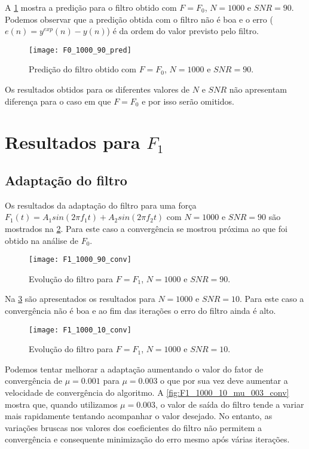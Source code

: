 A \cref{fig:F0_1000_90_pred} mostra a predição para o filtro obtido com $ F=F_0 $, $ N=1000 $ e $ SNR=90 $. Podemos observar que a predição obtida com o filtro não é boa e o erro ($ e(n)=y^{exp}(n) - y(n) $) é da ordem do valor previsto pelo filtro.

\begin{figure}[h]
	\centering
	\texttt{[image: F0\_1000\_90\_pred]}
	\caption{Predição do filtro obtido com $ F=F_0 $, $ N=1000 $ e $ SNR=90 $.}
	\label{fig:F0_1000_90_pred}
\end{figure}

Os resultados obtidos para os diferentes valores de $ N $ e $ SNR $ não apresentam diferença para o caso em que $ F=F_0 $ e por isso serão omitidos.

\section{Resultados para $ F_1 $}
\subsection{Adaptação do filtro}\label{adapt_F_1}

Os resultados da adaptação do filtro para uma força $F_1(t) = A_1 sin(2\pi f_1 t) + A_2 sin(2\pi f_2 t)$  com $ N=1000 $  e $ SNR = 90 $ são mostrados na \cref{fig:F1_1000_90_conv}. Para este caso a convergência se mostrou próxima ao que foi obtido na análise de $ F_0 $. 

\begin{figure}
	\centering
	\texttt{[image: F1\_1000\_90\_conv]}
	\caption{Evolução do filtro para $ F=F_1 $, $ N=1000 $ e $ SNR=90 $.}
	\label{fig:F1_1000_90_conv}
\end{figure}

Na \cref{fig:F1_1000_10_conv} são apresentados os resultados para $ N=1000 $ e $ SNR=10 $. Para este caso a convergência não é boa e ao fim das iterações o erro do filtro ainda é alto. 

\begin{figure}
	\centering
	\texttt{[image: F1\_1000\_10\_conv]}
	\caption{Evolução do filtro para $ F=F_1 $, $ N=1000 $ e $ SNR=10 $.}
	\label{fig:F1_1000_10_conv}
\end{figure}

Podemos tentar melhorar a adaptação aumentando o valor do fator de convergência de $ \mu=0.001 $ para $ \mu=0.003 $ o que por sua vez deve aumentar a velocidade de convergência do algoritmo. A \cref{fig:F1_1000_10_mu_003_conv} mostra que, quando utilizamos $ \mu = 0.003 $, o valor de saída do filtro tende a variar mais rapidamente tentando acompanhar o valor desejado. No entanto, as variações bruscas nos valores dos coeficientes do filtro não permitem a convergência e consequente minimização do erro mesmo após várias iterações. 

